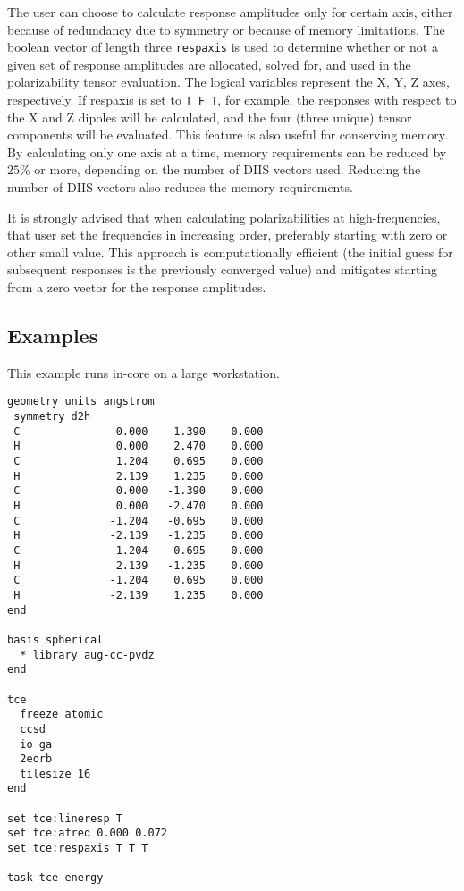 The user can choose to calculate response amplitudes only for certain axis, either because of redundancy due to symmetry or because of memory limitations.  The boolean vector of length three \verb+respaxis+ is used to determine whether or not a given set of response amplitudes are allocated, solved for, and used in the polarizability tensor evaluation.  The logical variables represent the X, Y, Z axes, respectively.  If respaxis is set to \verb+T F T+, for example, the responses with respect to the X and Z dipoles will be calculated, and the four (three unique) tensor components will be evaluated.  This feature is also useful for conserving memory.  By calculating only one axis at a time, memory requirements can be reduced by $25\%$ or more, depending on the number of DIIS vectors used.  Reducing the number of DIIS vectors also reduces the memory requirements.

It is strongly advised that when calculating polarizabilities at high-frequencies, that user set the frequencies in increasing order, preferably starting with zero or other small value.  This approach is computationally efficient (the initial guess for subsequent responses is the previously converged value) and mitigates starting from a zero vector for the response amplitudes.

\subsection{Examples}

This example runs in-core on a large workstation.

\begin{verbatim}
geometry units angstrom
 symmetry d2h
 C               0.000    1.390    0.000
 H               0.000    2.470    0.000
 C               1.204    0.695    0.000
 H               2.139    1.235    0.000
 C               0.000   -1.390    0.000
 H               0.000   -2.470    0.000
 C              -1.204   -0.695    0.000
 H              -2.139   -1.235    0.000
 C               1.204   -0.695    0.000
 H               2.139   -1.235    0.000
 C              -1.204    0.695    0.000
 H              -2.139    1.235    0.000
end

basis spherical
  * library aug-cc-pvdz
end

tce
  freeze atomic
  ccsd
  io ga
  2eorb
  tilesize 16
end

set tce:lineresp T
set tce:afreq 0.000 0.072
set tce:respaxis T T T

task tce energy
\end{verbatim}

